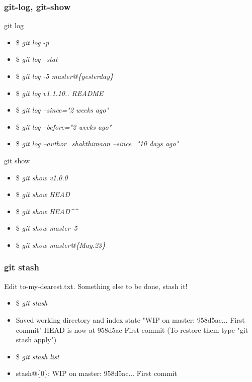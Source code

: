 \documentclass[10pt]{beamer}
\newcommand{\command}[1]{\textsl{\textit{#1}}}
\begin{document}
\begin{frame}[fragile]
\frametitle{git-log, git-show}

\begin{block}{git log}
\scriptsize
\begin{semiverbatim}
\begin{itemize}[<+-| alert@+>]
\item[]{\$ \command{git log -p}}
\item[]{\$ \command{git log --stat}}
\item[]{\$ \command{git log -5 master@\{yesterday\}}}
\item[]{\$ \command{git log v1.1.10.. README}}
\item[]{\$ \command{git log --since="2 weeks ago"}}
\item[]{\$ \command{git log --before="2 weeks ago"}}
\item[]{\$ \command{git log --author=shakthimaan --since="10 days ago"}}
\end{itemize}
\end{semiverbatim}
\end{block}

\begin{block}{git show}
\scriptsize
\begin{semiverbatim}
\begin{itemize}[<+-| alert@+>]
\item[]{\$ \command{git show v1.0.0}}
\item[]{\$ \command{git show HEAD}}
\item[]{\$ \command{git show HEAD^\^}}
\item[]{\$ \command{git show master~5}}
\item[]{\$ \command{git show master@\{May.23\}}}
\end{itemize}
\end{semiverbatim}
\end{block}

\end{frame}

%
%

\begin{frame}[fragile]
\frametitle{git stash}
Edit to-my-dearest.txt. Something else to be done, stash it!
\begin{block}{}
\scriptsize
\begin{semiverbatim}
\begin{itemize}[<+-| alert@+>]
\item[]{\$ \command{git stash}}
\item[]{Saved working directory and index state "WIP on master: 958d5ac... 
First commit"
HEAD is now at 958d5ac First commit
(To restore them type "git stash apply")}

\item[]{\$ \command{git stash list}}
\item[]{stash@\{0\}: WIP on master: 958d5ac... First commit}
\end{itemize}
\end{semiverbatim}
\end{block}

\end{frame}
\end{document}
